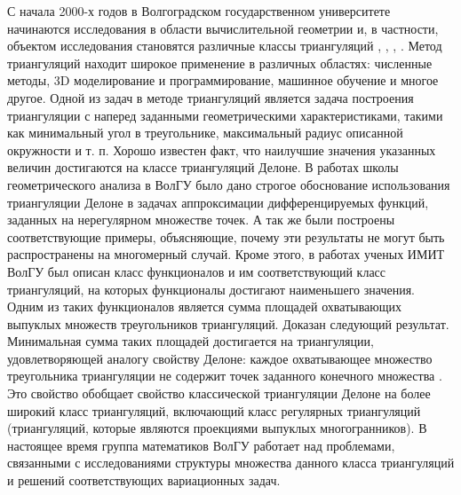 \documentclass[a4paper,11pt,twoside]{article}
\begin{document}
	С начала 2000-х годов в Волгоградском государственном университете начинаются исследования в области вычислительной геометрии и, в частности, объектом исследования становятся различные классы триангуляций \cite{6}, \cite{9}, \cite{17}, \cite{24}. Метод триангуляций находит широкое применение в различных областях: численные методы, 3D  моделирование и программирование,  машинное обучение и многое другое. Одной из задач в методе триангуляций является задача построения триангуляции с наперед заданными геометрическими характеристиками, такими как минимальный угол в треугольнике, максимальный радиус описанной окружности и т. п. Хорошо известен факт, что наилучшие значения указанных величин достигаются на классе триангуляций Делоне. В работах школы геометрического анализа в ВолГУ было дано строгое обоснование использования триангуляции Делоне в задачах аппроксимации дифференцируемых функций, заданных на нерегулярном множестве точек. А так же были построены соответствующие примеры, объясняющие, почему эти результаты не могут быть распространены на многомерный случай. Кроме этого, в работах ученых ИМИТ ВолГУ был описан класс функционалов и им соответствующий  класс триангуляций, на которых функционалы достигают наименьшего значения.  Одним из таких функционалов является сумма площадей охватывающих выпуклых множеств треугольников триангуляций. Доказан следующий результат. Минимальная сумма таких площадей достигается на триангуляции, удовлетворяющей аналогу свойству Делоне: каждое охватывающее множество треугольника триангуляции не содержит точек заданного конечного множества \cite{24}. Это свойство обобщает свойство классической триангуляции Делоне на более широкий класс триангуляций, включающий класс регулярных триангуляций (триангуляций, которые являются проекциями выпуклых многогранников). В настоящее время группа математиков ВолГУ работает над проблемами, связанными с исследованиями структуры множества данного класса триангуляций и решений соответствующих вариационных задач.
  
\end{document}
